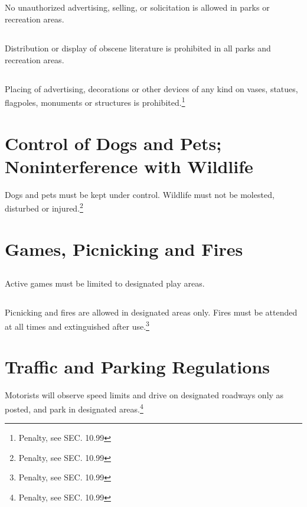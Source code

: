 \subsection{}
No unauthorized advertising, selling, or solicitation is allowed in parks or recreation areas.
\subsection{}
Distribution or display of obscene literature is prohibited in all parks and recreation areas.
\subsection{}
Placing of advertising, decorations or other devices of any kind on vases, statues, flagpoles, monuments or structures is prohibited.\footnote{Penalty, see SEC. 10.99}

\section{Control of Dogs and Pets; Noninterference with Wildlife}
Dogs and pets must be kept under control.  Wildlife must not be molested, disturbed or injured.\footnote{Penalty, see SEC. 10.99}

\section{Games, Picnicking and Fires}
\subsection{}
Active games must be limited to designated play areas.
\subsection{}
Picnicking and fires are allowed in designated areas only.  Fires must be attended at all times and extinguished after use.\footnote{Penalty, see SEC. 10.99}

\section{Traffic and Parking Regulations}
Motorists will observe speed limits and drive on designated roadways only as posted, and park in designated areas.\footnote{Penalty, see SEC. 10.99}

